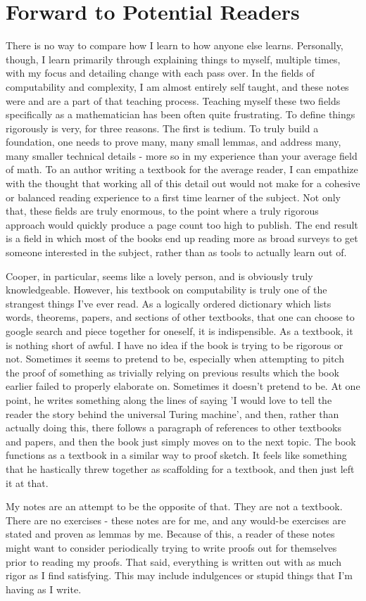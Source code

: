 \documentclass{article}
\theoremstyle{definition}
\theoremstyle{plain}
\theoremstyle{theorem}
\begin{document}
\section{Forward to Potential Readers}
	There is no way to compare how I learn to how anyone else learns. Personally, though, I learn primarily through explaining things to myself, multiple times, with my focus and detailing change with each pass over. In the fields of computability and complexity, I am almost entirely self taught, and these notes were and are a part of that teaching process. Teaching myself these two fields specifically as a mathematician has been often quite frustrating. To define things rigorously is very, for three reasons. The first is tedium. To truly build a foundation, one needs to prove many, many small lemmas, and address many, many smaller technical details - more so in my experience than your average field of math. To an author writing a textbook for the average reader, I can empathize with the thought that working all of this detail out would not make for a cohesive or balanced reading experience to a first time learner of the subject. Not only that, these fields are truly enormous, to the point where a truly rigorous approach would quickly produce a page count too high to publish. The end result is a field in which most of the books end up reading more as broad surveys to get someone interested in the subject, rather than as tools to actually learn out of. 
    \par Cooper, in particular, seems like a lovely person, and is obviously truly knowledgeable. However, his textbook on computability is truly one of the strangest things I've ever read. As a logically ordered dictionary which lists words, theorems, papers, and sections of other textbooks, that one can choose to google search and piece together for oneself, it is indispensible. As a textbook, it is nothing short of awful. I have no idea if the book is trying to be rigorous or not. Sometimes it seems to pretend to be, especially when attempting to pitch the proof of something as trivially relying on previous results which the book earlier failed to properly elaborate on. Sometimes it doesn't pretend to be. At one point, he writes something along the lines of saying 'I would love to tell the reader the story behind the universal Turing machine', and then, rather than actually doing this, there follows a paragraph of references to other textbooks and papers, and then the book just simply moves on to the next topic. The book functions as a textbook in a similar way to proof sketch. It feels like something that he hastically threw together as scaffolding for a textbook, and then just left it at that. 
	\par My notes are an attempt to be the opposite of that. They are not a textbook. There are no exercises - these notes are for me, and any would-be exercises are stated and proven as lemmas by me. Because of this, a reader of these notes might want to consider periodically trying to write proofs out for themselves prior to reading my proofs. That said, everything is written out with as much rigor as I find satisfying. This may include indulgences or stupid things that I'm having as I write. 
\fi
\end{document}
